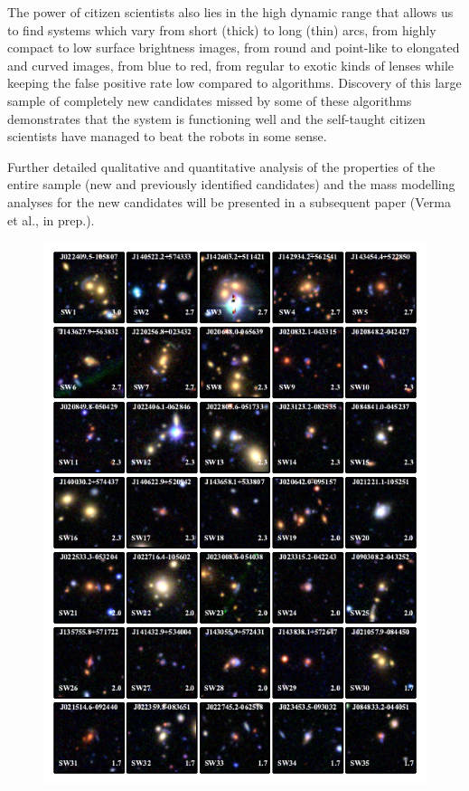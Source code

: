 \documentclass[useAMS,usenatbib,a4paper]{mn2e}
\begin{document}
The power of citizen scientists also lies in the high dynamic range that
allows us to find systems which vary from short (thick) to long (thin)
arcs, from highly compact to low surface brightness images, from round
and point-like to elongated and curved images, from blue to red, from
regular to exotic kinds of lenses while keeping the false positive rate
low compared to algorithms. Discovery of this large sample of completely
new candidates missed by some of these algorithms demonstrates that the
\sw system is functioning well and the self-taught citizen scientists
have managed to beat the robots in some sense.

Further detailed qualitative and quantitative analysis of the properties
of the entire \sw sample (new and previously identified candidates) and
the mass modelling analyses for the new candidates will be presented in
a subsequent \sw paper (Verma et al., in prep.).

\begin{figure}
\begin{center}
\includegraphics[scale=1.9]{lenscandfin.pdf}
\end{center}
\end{figure}
\end{document}
